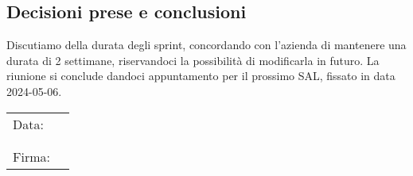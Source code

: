 \documentclass[italian,12pt]{article}
\begin{document}
\subsection{Decisioni prese e conclusioni}
Discutiamo della durata degli sprint, concordando con l'azienda di mantenere una durata di 2 settimane, riservandoci la possibilità di modificarla in futuro.
La riunione si conclude dandoci appuntamento per il prossimo SAL, ﬁssato in data 2024-05-06.
\begin{table}[b]
	\begin{tabular}{@{}p{.5in}p{4in}@{}}
		Data:  & \hrulefill \\
			   &     		\\
			   &     		\\
		Firma: & \hrulefill \\
	\end{tabular}
	\end{table}
\end{document}
